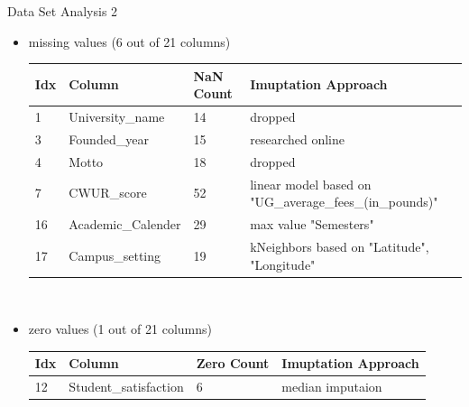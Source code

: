 \documentclass{beamer} %
\begin{document}
\begin{frame}{Data Set Analysis 2}
  \vspace{-1cm}
  \begin{itemize}
  \item missing values (6 out of 21 columns)
    \begin{table}[h]
      \centering
      \tiny
      \begin{tabular}{l|l|l|l}
        Idx & Column & NaN Count & Imuptation Approach \\
        \hline
        1  & University\_name   & 14 & dropped \\
        3  & Founded\_year      & 15 & researched online \\
        4  & Motto              & 18 & dropped \\
        7  & CWUR\_score        & 52 & linear model based on "UG\_average\_fees\_(in\_pounds)" \\
        16 & Academic\_Calender & 29 & max value "Semesters" \\
        17 & Campus\_setting    & 19 & kNeighbors based on "Latitude", "Longitude"
      \end{tabular}\hfill\
      \label{tab:missing_values_nan}
    \end{table}
  \item zero values  (1 out of 21 columns)
    \begin{table}[h]
      \centering
      \tiny
      \begin{tabular}{l|l|l|l}
        Idx & Column & Zero Count & Imuptation Approach \\
        \hline
        12  & Student\_satisfaction & 6 & median imputaion \\
      \end{tabular}\hfill\
      \label{tab:missing_values_zero}
    \end{table}
  \end{itemize}
\end{frame}
\end{document}
